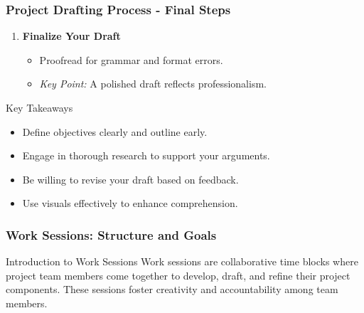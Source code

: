 \documentclass[aspectratio=169]{beamer}
\begin{document}
\begin{frame}[fragile]
    \frametitle{Project Drafting Process - Final Steps}
    \begin{enumerate}[resume]
        \item \textbf{Finalize Your Draft}
            \begin{itemize}
                \item Proofread for grammar and format errors.
                \item \textit{Key Point:} A polished draft reflects professionalism.
            \end{itemize}
    \end{enumerate}
    
    \begin{block}{Key Takeaways}
        \begin{itemize}
            \item Define objectives clearly and outline early.
            \item Engage in thorough research to support your arguments.
            \item Be willing to revise your draft based on feedback.
            \item Use visuals effectively to enhance comprehension.
        \end{itemize}
    \end{block}
\end{frame}

\begin{frame}[fragile]
    \frametitle{Work Sessions: Structure and Goals}
    \begin{block}{Introduction to Work Sessions}
        Work sessions are collaborative time blocks where project team members come together to develop, draft, and refine their project components. 
        These sessions foster creativity and accountability among team members.
    \end{block}
\end{frame}
\end{document}

